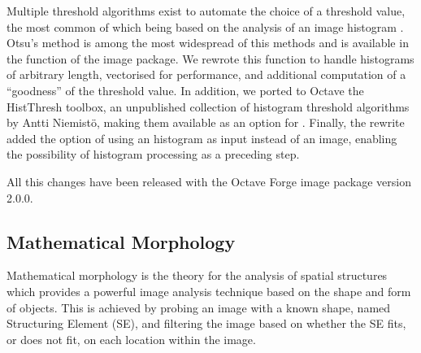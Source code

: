 Multiple threshold algorithms exist to automate the choice of a
threshold value, the most common of which being based on the analysis
of an image histogram \citep{analysis-hist-threshold}.  Otsu's method
\citep{otsu-threshold} is among the most widespread of this methods
and is available in the function  of the image
package.  We rewrote this function to handle histograms of arbitrary
length, vectorised for performance, and additional computation of a
``goodness'' of the threshold value.  In addition, we ported to Octave
the HistThresh toolbox, an unpublished collection of histogram
threshold algorithms by Antti Niemistö, making them available as an
option for .  Finally, the rewrite added the
option of using an histogram as input instead of an image, enabling
the possibility of histogram processing as a preceding step.


All this changes have been released with the Octave Forge image
package version 2.0.0.

\subsection{Mathematical Morphology}

Mathematical morphology is the theory for the analysis of spatial
structures which provides a powerful image analysis technique based on
the shape and form of objects.  This is achieved by probing an image
with a known shape, named Structuring Element (SE), and filtering the
image based on whether the SE fits, or does not fit, on each location
within the image.


